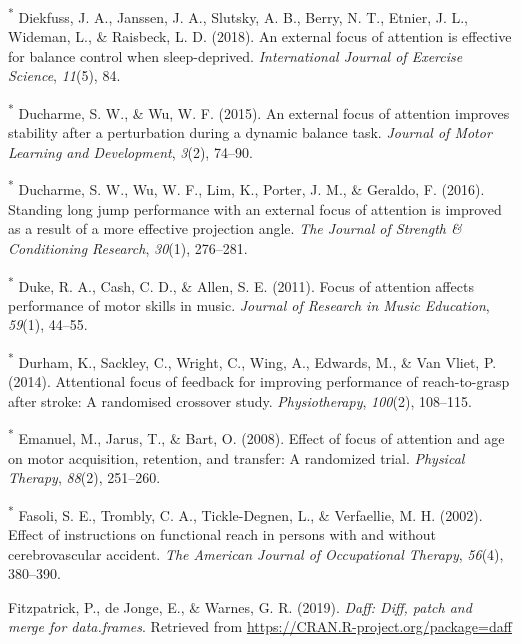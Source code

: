 \documentclass[
  man, donotrepeattitle,floatsintext]{apa7}
\newlength{\cslhangindent}
\newlength{\cslentryspacingunit} %
\newenvironment{CSLReferences}[2] %
 {%
  \setlength{\parindent}{0pt}
  \ifodd #1
  \let\oldpar\par
  \def\par{\hangindent=\cslhangindent\oldpar}
  \fi
  \setlength{\parskip}{#2\cslentryspacingunit}
 }%
 {}
\begin{document}
\begin{CSLReferences}{1}{0}
\leavevmode{}%
\textsuperscript{*} Diekfuss, J. A., Janssen, J. A., Slutsky, A. B., Berry, N. T., Etnier, J. L., Wideman, L., \& Raisbeck, L. D. (2018). An external focus of attention is effective for balance control when sleep-deprived. \emph{International Journal of Exercise Science}, \emph{11}(5), 84.

\leavevmode{}%
\textsuperscript{*} Ducharme, S. W., \& Wu, W. F. (2015). An external focus of attention improves stability after a perturbation during a dynamic balance task. \emph{Journal of Motor Learning and Development}, \emph{3}(2), 74--90.

\leavevmode{}%
\textsuperscript{*} Ducharme, S. W., Wu, W. F., Lim, K., Porter, J. M., \& Geraldo, F. (2016). Standing long jump performance with an external focus of attention is improved as a result of a more effective projection angle. \emph{The Journal of Strength \& Conditioning Research}, \emph{30}(1), 276--281.

\leavevmode{}%
\textsuperscript{*} Duke, R. A., Cash, C. D., \& Allen, S. E. (2011). Focus of attention affects performance of motor skills in music. \emph{Journal of Research in Music Education}, \emph{59}(1), 44--55.

\leavevmode{}%
\textsuperscript{*} Durham, K., Sackley, C., Wright, C., Wing, A., Edwards, M., \& Van Vliet, P. (2014). Attentional focus of feedback for improving performance of reach-to-grasp after stroke: A randomised crossover study. \emph{Physiotherapy}, \emph{100}(2), 108--115.

\leavevmode{}%
\textsuperscript{*} Emanuel, M., Jarus, T., \& Bart, O. (2008). Effect of focus of attention and age on motor acquisition, retention, and transfer: A randomized trial. \emph{Physical Therapy}, \emph{88}(2), 251--260.

\leavevmode{}%
\textsuperscript{*} Fasoli, S. E., Trombly, C. A., Tickle-Degnen, L., \& Verfaellie, M. H. (2002). Effect of instructions on functional reach in persons with and without cerebrovascular accident. \emph{The American Journal of Occupational Therapy}, \emph{56}(4), 380--390.

\leavevmode{}%
Fitzpatrick, P., de Jonge, E., \& Warnes, G. R. (2019). \emph{Daff: Diff, patch and merge for data.frames}. Retrieved from \url{https://CRAN.R-project.org/package=daff}


\end{CSLReferences}
\end{document}
